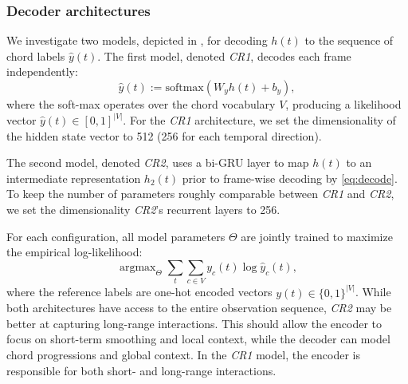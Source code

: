 \documentclass{article}
\DeclareMathOperator*{\argmax}{argmax}
\begin{document}
\subsubsection{Decoder architectures}
We investigate two models, depicted in , for decoding $h(t)$ to the sequence of chord labels $\hat{y}(t)$.
The first model, denoted \emph{CR1}, decodes each frame independently:
\begin{equation}
    \hat{y}(t) := \text{softmax}\left(W_y h(t) + b_y\right),\label{eq:decode}
\end{equation}
where the soft-max operates over the chord vocabulary $V$, producing a likelihood vector $\hat{y}(t) \in {[0,1]}^{|V|}$.
For the \emph{CR1} architecture, we set the dimensionality of the hidden state vector to 512 (256 for each temporal direction).

The second model, denoted \emph{CR2}, uses a bi-GRU layer to map $h(t)$ to an intermediate representation $h_2(t)$ prior to frame-wise decoding by \cref{eq:decode}.
To keep the number of parameters roughly comparable between \emph{CR1} and \emph{CR2}, we set the dimensionality \emph{CR2}'s recurrent layers to 256.

For each configuration, all model parameters $\Theta$ are jointly trained to maximize the empirical log-likelihood:
\begin{equation}
    \argmax_\Theta    \sum_t \sum_{c \in V} y_c(t) \log \hat{y}_c(t), \label{objective}
\end{equation}
where the reference labels are one-hot encoded vectors $y(t) \in {\{0,1\}}^{|V|}$.
While both architectures have access to the entire observation sequence, \emph{CR2} may be better at capturing long-range interactions.
This should allow the encoder to focus on short-term smoothing and local context, while the decoder can model chord progressions and global context.
In the \emph{CR1} model, the encoder is responsible for both short- and long-range interactions.
\end{document}
